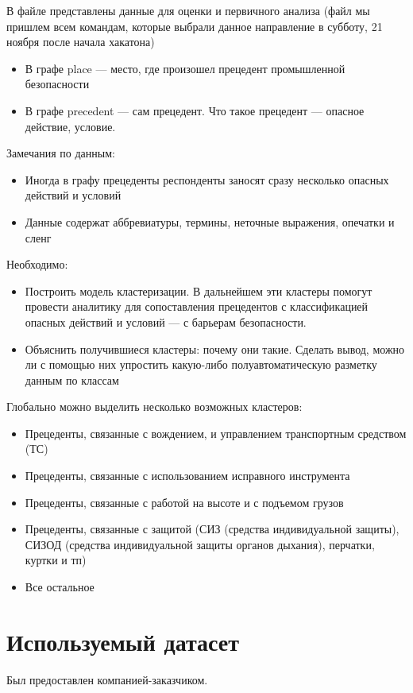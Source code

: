 \documentclass{article}
\begin{document}
В файле представлены данные для оценки и первичного анализа (файл мы пришлем всем командам, которые выбрали данное направление в субботу, 21 ноября после начала хакатона)
\begin{itemize}
    \item В графе place — место, где произошел прецедент промышленной безопасности
    \item В графе precedent — сам прецедент. Что такое прецедент — опасное действие, условие.
\end{itemize}

Замечания по данным:
\begin{itemize}
    \item Иногда в графу прецеденты респонденты заносят сразу несколько опасных действий и условий
    \item Данные содержат аббревиатуры, термины, неточные выражения, опечатки и сленг
\end{itemize}

Необходимо:
\begin{itemize}
    \item Построить модель кластеризации. В дальнейшем эти кластеры помогут провести аналитику для сопоставления прецедентов с классификацией опасных действий и условий — с барьерам безопасности.
    \item Объяснить получившиеся кластеры: почему они такие. Сделать вывод, можно ли с помощью них упростить какую-либо полуавтоматическую разметку данным по классам
\end{itemize}

Глобально можно выделить несколько возможных кластеров:
\begin{itemize}
    \item Прецеденты, связанные с вождением, и управлением транспортным средством (ТС)
    \item Прецеденты, связанные с использованием исправного инструмента
    \item Прецеденты, связанные с работой на высоте и с подъемом грузов
    \item Прецеденты, связанные с защитой (СИЗ (средства индивидуальной защиты), СИЗОД (средства индивидуальной защиты органов дыхания), перчатки, куртки и тп)
    \item Все остальное
\end{itemize}

\section{Используемый датасет}
Был предоставлен компанией-заказчиком.
\end{document}
